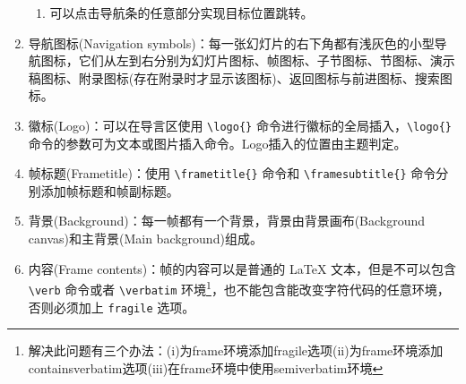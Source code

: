 \documentclass{beamer}
\begin{document}
\begin{frame}
\begin{enumerate}
\begin{enumerate}
		\item 可以点击导航条的任意部分实现目标位置跳转。
	\end{enumerate}
	\item 导航图标(Navigation symbols)：每一张幻灯片的右下角都有浅灰色的小型导航图标，它们从左到右分别为幻灯片图标、帧图标、子节图标、节图标、演示稿图标、附录图标(存在附录时才显示该图标)、返回图标与前进图标、搜索图标。
	\item 徽标(Logo)：可以在导言区使用 \verb|\logo{}| 命令进行徽标的全局插入，\verb|\logo{}| 命令的参数可为文本或图片插入命令。Logo插入的位置由主题判定。
	\item 帧标题(Frametitle)：使用 \verb|\frametitle{}| 命令和 \verb|\framesubtitle{}| 命令分别添加帧标题和帧副标题。
	\item 背景(Background)：每一帧都有一个背景，背景由背景画布(Background canvas)和主背景(Main background)组成。
	\item 内容(Frame contents)：帧的内容可以是普通的 \LaTeX{} 文本，但是不可以包含 \verb|\verb| 命令或者 \verb|\verbatim| 环境\footnote{解决此问题有三个办法：(i)为frame环境添加fragile选项(ii)为frame环境添加containsverbatim选项(iii)在frame环境中使用semiverbatim环境}，也不能包含能改变字符代码的任意环境，否则必须加上 \verb|fragile| 选项。
\end{enumerate}
\end{frame}

\end{document}
